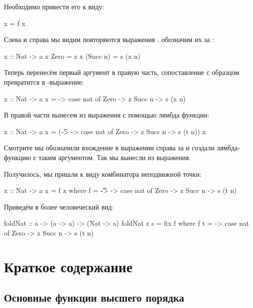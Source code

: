 Необходимо привести его к виду:

\begin{code}
x = f x
\end{code}

Слева и справа мы видим повторяются выражения , 
обозначим их за :

\begin{code}
x :: Nat -> a
x Zero      = z
x (Succ n)  = s (x n)
\end{code}

Теперь перенесём первый аргумент в правую часть, 
сопоставление с образцом превратится в -выражение:

\begin{code}
x :: Nat -> a
x = \nat -> case nat of
                Zero    -> z
                Succ n  -> s (x n)
\end{code}

В правой части вынесем  из выражения
с помощью лямбда функции:

\begin{code}
x :: Nat -> a
x = (\t -> \nat -> case nat of
                        Zero    -> z
                        Succ n  -> s (t n)) x 
\end{code}

Смотрите мы обозначили вхождение  в выражении справа
за  и создали лямбда-функцию с таким аргументом. 
Так мы вынесли  из выражения. 

Получилось, мы пришли к виду комбинатора неподвижной точки:

\begin{code}
x :: Nat -> a
x = f x
    where f = \t -> \nat -> case nat of
                        Zero    -> z
                        Succ n  -> s (t n)
\end{code}

Приведём в более человеческий вид:

\begin{code}
foldNat :: a -> (a -> a) -> (Nat -> a)
foldNat z s = fix f
    where f t = \nat -> case nat of
                            Zero    -> z
                            Succ n  -> s (t n)
\end{code}


\section{Краткое содержание}


\subsection*{Основные функции высшего порядка}


